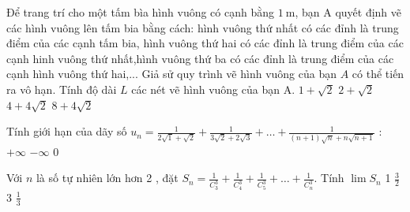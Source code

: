 \begin{ex}%
	Để trang trí cho một tấm bìa hình vuông có cạnh bằng $1 \mathrm{~m}$, bạn $\mathrm{A}$ quyết định vẽ các hình vuông lên tấm bia bằng cách: hình vuông thứ nhất có các đỉnh là trung điểm của các cạnh tấm bia, hình vuông thứ hai có các đỉnh là trung điểm của các cạnh hinh vuông thứ nhất,hình vuông thứ ba có các đỉnh là trung điểm của các cạnh hình vuông thứ hai,... Giả sử quy trình vẽ hình vuông của bạn $A$ có thể tiến ra vô hạn. Tính độ dài $L$ các nét vẽ hình vuông của bạn $\mathrm{A}$.
\choice
{$1+\sqrt{2}$}
{$2+\sqrt{2}$}
{\True $4+4 \sqrt{2}$}
{$8+4 \sqrt{2}$}
\end{ex}
\begin{ex}%
	Tính giới hạn của dãy số $u_n=\frac{1}{2 \sqrt{1}+\sqrt{2}}+\frac{1}{3 \sqrt{2}+2 \sqrt{3}}+\ldots+\frac{1}{(n+1) \sqrt{n}+n \sqrt{n+1}}$ :
\choice
{$+\infty$}
{$-\infty$}
{0 }
{  }
\end{ex}
\begin{ex}%
	Với $n$ là số tự nhiên lớn hơn 2 , đặt $S_n=\frac{1}{C_3^3}+\frac{1}{C_4^3}+\frac{1}{C_5^3}+\ldots+\frac{1}{C_n^3}$. Tính $\lim S_n$
\choice
{1} 
{$\frac{3}{2}$}
{3}
{$\frac{1}{3}$}
\end{ex}
